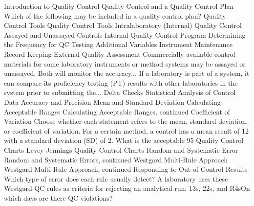 
Introduction to Quality Control
Quality Control and a Quality Control Plan
Which of the following may be included in a quality control plan?
Quality Control Tools
Quality Control Tools
Intralaboratory (Internal) Quality Control
Assayed and Unassayed Controls
Internal Quality Control Program
Determining the Frequency for QC Testing
Additional Variables
Instrument Maintenance
Record Keeping
External Quality Assessment
Commercially available control materials for some laboratory instruments or method systems may be assayed or unassayed. Both will monitor the accuracy...
If a laboratory is part of a system, it can compare its proficiency testing (PT) results with other laboratories in the system prior to submitting the...
Delta Checks
Statistical Analysis of Control Data
Accuracy and Precision
Mean and Standard Deviation
Calculating Acceptable Ranges
Calculating Acceptable Ranges, continued
Coefficient of Variation
Choose whether each statement refers to the mean, standard deviation, or coefficient of variation.
For a certain method, a control has a mean result of 12 with a standard deviation (SD) of 2. What is the acceptable 95%
Quality Control Charts
Levey-Jennings Quality Control Charts
Random and Systematic Error
Random and Systematic Errors, continued
Westgard Multi-Rule Approach
Westgard Multi-Rule Approach, continued
Responding to Out-of-Control Results
Which type of error does each rule usually detect?
A laboratory uses these Westgard QC rules as criteria for rejecting an analytical run: 13s, 22s, and R4sOn which days are there QC violations?
